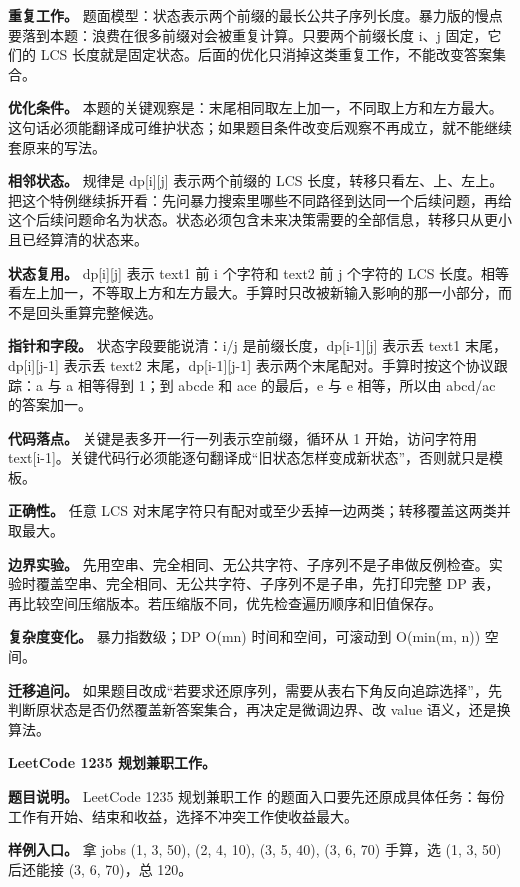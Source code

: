 \textbf{重复工作。} 题面模型：状态表示两个前缀的最长公共子序列长度。暴力版的慢点要落到本题：浪费在很多前缀对会被重复计算。只要两个前缀长度 i、j 固定，它们的 LCS 长度就是固定状态。后面的优化只消掉这类重复工作，不能改变答案集合。

\textbf{优化条件。} 本题的关键观察是：末尾相同取左上加一，不同取上方和左方最大。这句话必须能翻译成可维护状态；如果题目条件改变后观察不再成立，就不能继续套原来的写法。

\textbf{相邻状态。} 规律是 dp[i][j] 表示两个前缀的 LCS 长度，转移只看左、上、左上。把这个特例继续拆开看：先问暴力搜索里哪些不同路径到达同一个后续问题，再给这个后续问题命名为状态。状态必须包含未来决策需要的全部信息，转移只从更小且已经算清的状态来。

\textbf{状态复用。} dp[i][j] 表示 text1 前 i 个字符和 text2 前 j 个字符的 LCS 长度。相等看左上加一，不等取上方和左方最大。手算时只改被新输入影响的那一小部分，而不是回头重算完整候选。

\textbf{指针和字段。} 状态字段要能说清：i/j 是前缀长度，dp[i-1][j] 表示丢 text1 末尾，dp[i][j-1] 表示丢 text2 末尾，dp[i-1][j-1] 表示两个末尾配对。手算时按这个协议跟踪：a 与 a 相等得到 1；到 abcde 和 ace 的最后，e 与 e 相等，所以由 abcd/ac 的答案加一。

\textbf{代码落点。} 关键是表多开一行一列表示空前缀，循环从 1 开始，访问字符用 text[i-1]。关键代码行必须能逐句翻译成“旧状态怎样变成新状态”，否则就只是模板。

\textbf{正确性。} 任意 LCS 对末尾字符只有配对或至少丢掉一边两类；转移覆盖这两类并取最大。

\textbf{边界实验。} 先用空串、完全相同、无公共字符、子序列不是子串做反例检查。实验时覆盖空串、完全相同、无公共字符、子序列不是子串，先打印完整 DP 表，再比较空间压缩版本。若压缩版不同，优先检查遍历顺序和旧值保存。

\textbf{复杂度变化。} 暴力指数级；DP O(mn) 时间和空间，可滚动到 O(min(m, n)) 空间。

\textbf{迁移追问。} 如果题目改成“若要求还原序列，需要从表右下角反向追踪选择”，先判断原状态是否仍然覆盖新答案集合，再决定是微调边界、改 value 语义，还是换算法。

\noindent\textbf{LeetCode 1235 规划兼职工作。}

\textbf{题目说明。} LeetCode 1235 规划兼职工作 的题面入口要先还原成具体任务：每份工作有开始、结束和收益，选择不冲突工作使收益最大。

\textbf{样例入口。} 拿 jobs (1, 3, 50), (2, 4, 10), (3, 5, 40), (3, 6, 70) 手算，选 (1, 3, 50) 后还能接 (3, 6, 70)，总 120。

